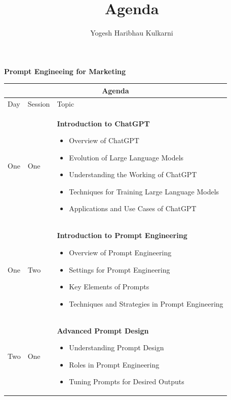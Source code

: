 \documentclass[a4paper, 11pt]{article}
\title{Agenda}
\author{Yogesh Haribhau Kulkarni}
\begin{document}
\pagestyle{mystyle}

\makebox[\linewidth]{\rule{\linewidth}{1pt}}
\begin{center} 
\textbf{\Large Prompt Engineeing for Marketing}
\end{center}
\makebox[\linewidth]{\rule{\linewidth}{1pt}}

%

\begin{center} 
\begin{tabular}{ |p{1cm}|p{1cm}||p{10cm}|  }
 \hline
 \multicolumn{3}{|c|}{\textbf{\large Agenda}} \\
 \hline
Day & Session & Topic\\
 \hline
 One   &  One    &  \textbf{Introduction to ChatGPT}
\begin{itemize}[itemsep=0pt]
\item Overview of ChatGPT
\item Evolution of Large Language Models
\item Understanding the Working of ChatGPT
\item Techniques for Training Large Language Models
\item Applications and Use Cases of ChatGPT
\end{itemize} 
\\
One &   Two  &   \textbf{Introduction to Prompt Engineering}
 \begin{itemize}[itemsep=0pt]
\item Overview of Prompt Engineering
\item Settings for Prompt Engineering
\item Key Elements of Prompts
\item Techniques and Strategies in Prompt Engineering
\end{itemize} 
\\
Two   &  One    & \textbf{Advanced Prompt Design}
 \begin{itemize}[itemsep=0pt]
\item Understanding Prompt Design
\item Roles in Prompt Engineering
\item Tuning Prompts for Desired Outputs

\end{itemize}
\end{tabular}
\end{center}
\end{document}
